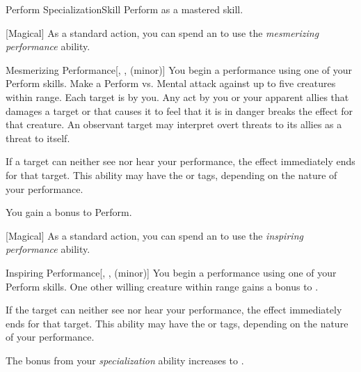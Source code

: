     \begin{feat}{Perform Specialization}{Skill}
        \featpre Perform as a mastered skill.

        [Magical] As a standard action, you can spend an  to use the \textit{mesmerizing performance} ability.
        \begin{ability}{Mesmerizing Performance}[, ,  (minor)]
            You begin a performance using one of your Perform skills.
            Make a Perform vs. Mental attack against up to five creatures within \rngmed range.
            \hit Each target is \fascinated by you.
            Any act by you or your apparent allies that damages a target or that causes it to feel that it is in danger breaks the effect for that creature.
            An observant target may interpret overt threats to its allies as a threat to itself.

            If a target can neither see nor hear your performance, the effect immediately ends for that target.
            This ability may have the  or  tags, depending on the nature of your performance.
        \end{ability}

         You gain a  bonus to Perform.

        [Magical] As a standard action, you can spend an  to use the \textit{inspiring performance} ability.
        \begin{ability}{Inspiring Performance}[, ,  (minor)]
            You begin a performance using one of your Perform skills.
            One other willing creature within \rngmed range gains a  bonus to .

            If the target can neither see nor hear your performance, the effect immediately ends for that target.
            This ability may have the  or  tags, depending on the nature of your performance.
        \end{ability}

         The bonus from your \textit{specialization} ability increases to .


\end{feat}
